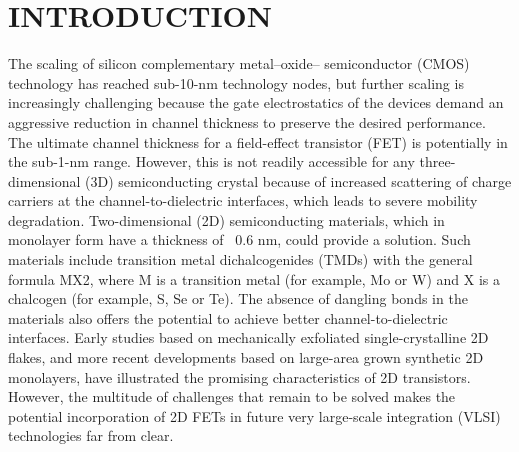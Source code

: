 \documentclass[12pt,a4paper]{report}
\begin{document}
\chapter{INTRODUCTION}
The scaling of silicon complementary metal–oxide– semiconductor (CMOS) technology has reached sub-10-nm technology nodes, but further scaling is increasingly challenging because the gate electrostatics of the devices demand an aggressive reduction in channel thickness to preserve the desired performance. The ultimate channel thickness for a field-effect transistor (FET) is potentially in the sub-1-nm range. However, this is not readily accessible for any three-dimensional (3D) semiconducting crystal because of increased scattering of charge carriers at the channel-to-dielectric interfaces, which leads to severe mobility degradation. Two-dimensional (2D) semiconducting materials, which in monolayer form have a thickness of ~0.6 nm, could provide a solution. Such materials include transition metal dichalcogenides (TMDs) with the general formula MX2, where M is a transition metal (for example, Mo or W) and X is a chalcogen (for example, S, Se or Te). The absence of dangling bonds in the materials also offers the potential to achieve better channel-to-dielectric interfaces. Early studies based on mechanically exfoliated single-crystalline 2D flakes, and more recent developments based on large-area grown synthetic 2D monolayers, have illustrated the promising characteristics of 2D transistors. However, the multitude of challenges that remain to be solved makes the potential incorporation of 2D FETs in future very large-scale integration (VLSI) technologies far from clear. 
\end{document}
